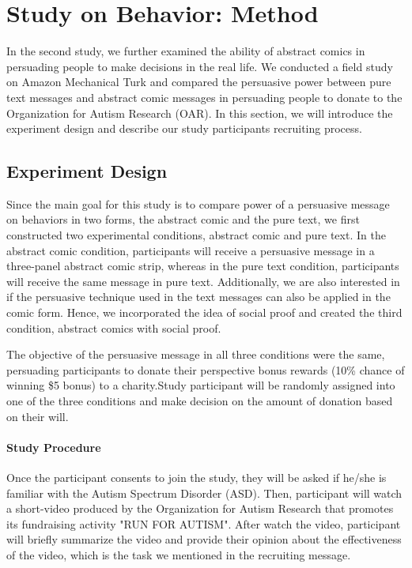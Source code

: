 \section{Study on Behavior: Method}
\label{sec:Method2}

In the second study, we further examined the ability of abstract comics in persuading people to make decisions in the real life. We conducted a field study on Amazon Mechanical Turk and compared the persuasive power between pure text messages and abstract comic messages in persuading people to donate to the Organization for Autism Research (OAR). In this section, we will introduce the experiment design and describe our study participants recruiting process.

\subsection{Experiment Design}
Since the main goal for this study is to compare power of a persuasive message on behaviors in two forms, the abstract comic and the pure text, we first constructed two experimental conditions, abstract comic and pure text. In the abstract comic condition, participants will receive a persuasive message in a three-panel abstract comic strip, whereas in the pure text condition, participants will receive the same message in pure text. Additionally, we are also interested in if the persuasive technique used in the text messages can also be applied in the comic form. Hence, we incorporated the idea of social proof and created the third condition, abstract comics with social proof.

The objective of the persuasive message in all three conditions were the same, persuading participants to donate their perspective bonus rewards (10\% chance of winning \$5 bonus) to a charity.Study participant will be randomly assigned into one of the three conditions and make decision on the amount of donation based on their will.

\paragraph{Study Procedure} Once the participant consents to join the study, they will be asked if he/she is familiar with the Autism Spectrum Disorder (ASD). Then, participant will watch a short-video produced by the Organization for Autism Research that promotes its fundraising activity "RUN FOR AUTISM". After watch the video, participant will briefly summarize the video and provide their opinion about the effectiveness of the video, which is the task we mentioned in the recruiting message.

